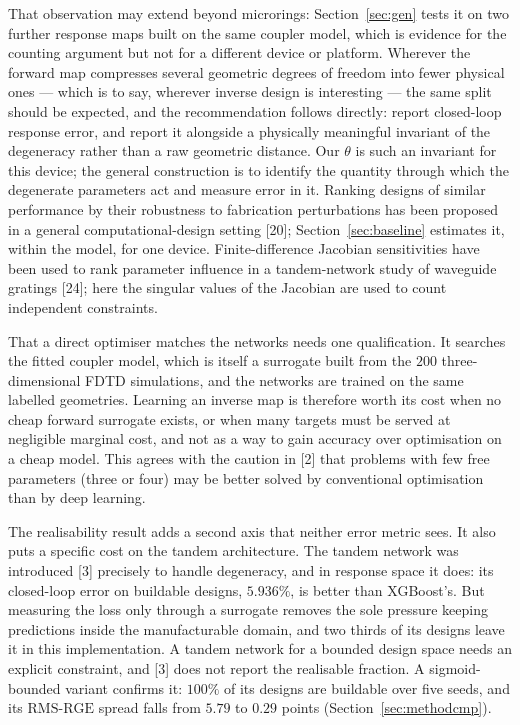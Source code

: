 \documentclass[11pt]{article}
\newcommand{\rge}{\mathrm{RMS\text{-}RGE}}
\begin{document}
That observation may extend beyond microrings: Section~\ref{sec:gen} tests it on two further response maps built on the same coupler model, which is evidence for the counting argument but not for a different device or platform. Wherever the forward map
compresses several geometric degrees of freedom into fewer physical ones ---
which is to say, wherever inverse design is interesting --- the same split
should be expected, and the recommendation follows directly: report
closed-loop response error, and report it alongside a physically meaningful
invariant of the degeneracy rather than a raw geometric distance. Our $\theta$
is such an invariant for this device; the general construction is to identify
the quantity through which the degenerate parameters act and measure error in
it. Ranking designs of similar performance by their robustness to fabrication perturbations has been proposed in a general computational-design setting [20]; Section~\ref{sec:baseline} estimates it, within the model, for one device. Finite-difference Jacobian sensitivities have been used to rank parameter influence in a tandem-network study of waveguide gratings [24]; here the singular values of the Jacobian are used to count independent constraints.

That a direct optimiser matches the networks needs one qualification. It searches the fitted coupler model, which is itself a surrogate built from the $200$ three-dimensional FDTD simulations, and the networks are trained on the same labelled geometries. Learning an inverse map is therefore worth its cost when no cheap forward surrogate exists, or when many targets must be served at negligible marginal cost, and not as a way to gain accuracy over optimisation on a cheap model. This agrees with the caution in [2] that problems with few free parameters (three or four) may be better solved by conventional optimisation than by deep learning.

The realisability result adds a second axis that neither error metric sees. It
also puts a specific cost on the tandem architecture. The tandem network was
introduced [3] precisely to handle degeneracy, and in response space it does:
its closed-loop error on buildable designs, $5.936\%$, is better than
XGBoost's. But measuring the loss only through a surrogate removes the sole
pressure keeping predictions inside the manufacturable domain, and two thirds of its designs leave it in this implementation. A tandem network for a bounded design space needs an
explicit constraint, and [3] does not report the realisable
fraction. A sigmoid-bounded variant confirms it: $100\%$ of its designs are buildable over five seeds, and its $\rge$ spread falls from $5.79$ to $0.29$ points (Section~\ref{sec:methodcmp}).
\end{document}
